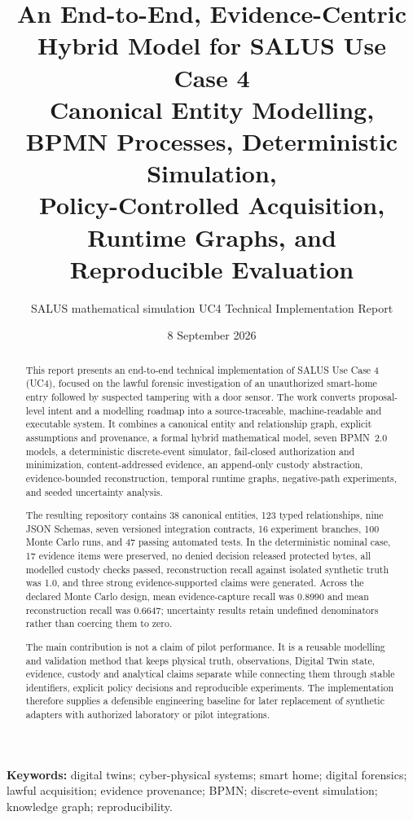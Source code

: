 ﻿\documentclass[11pt,a4paper]{article}
\title{\vspace{-12mm}\textbf{An End-to-End, Evidence-Centric Hybrid Model for SALUS Use Case 4}\\[2mm]
\large Canonical Entity Modelling, BPMN Processes, Deterministic Simulation,\\
Policy-Controlled Acquisition, Runtime Graphs, and Reproducible Evaluation}
\author{SALUS mathematical simulation UC4 Technical Implementation Report}
\date{8 September 2026}
\begin{document}
\maketitle

\begin{abstract}
This report presents an end-to-end technical implementation of SALUS Use Case 4 (UC4), focused on the lawful forensic investigation of an unauthorized smart-home entry followed by suspected tampering with a door sensor. The work converts proposal-level intent and a modelling roadmap into a source-traceable, machine-readable and executable system. It combines a canonical entity and relationship graph, explicit assumptions and provenance, a formal hybrid mathematical model, seven BPMN~2.0 models, a deterministic discrete-event simulator, fail-closed authorization and minimization, content-addressed evidence, an append-only custody abstraction, evidence-bounded reconstruction, temporal runtime graphs, negative-path experiments, and seeded uncertainty analysis.

The resulting repository contains 38 canonical entities, 123 typed relationships, nine JSON Schemas, seven versioned integration contracts, 16 experiment branches, 100 Monte Carlo runs, and 47 passing automated tests. In the deterministic nominal case, 17 evidence items were preserved, no denied decision released protected bytes, all modelled custody checks passed, reconstruction recall against isolated synthetic truth was 1.0, and three strong evidence-supported claims were generated. Across the declared Monte Carlo design, mean evidence-capture recall was 0.8990 and mean reconstruction recall was 0.6647; uncertainty results retain undefined denominators rather than coercing them to zero.

The main contribution is not a claim of pilot performance. It is a reusable modelling and validation method that keeps physical truth, observations, Digital Twin state, evidence, custody and analytical claims separate while connecting them through stable identifiers, explicit policy decisions and reproducible experiments. The implementation therefore supplies a defensible engineering baseline for later replacement of synthetic adapters with authorized laboratory or pilot integrations.
\end{abstract}

\textbf{Keywords:} digital twins; cyber-physical systems; smart home; digital forensics; lawful acquisition; evidence provenance; BPMN; discrete-event simulation; knowledge graph; reproducibility.
\end{document}
